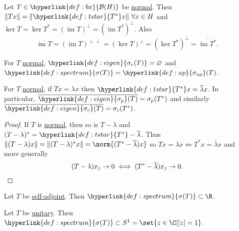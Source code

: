 \documentclass{article}
\renewcommand{\emptyset}{\varnothing}
\DeclareMathOperator{\im}{im}
\begin{document}

\begin{ex}
    Let $T \in \hyperlink{def:bx}{\mathcal{B}(H)}$ be \hyperlink{def:normalMap}{normal}.
    Then $\|Tx\| = \|\hyperlink{def:tstar}{T^*} x\| \ \forall x \in H$ and $\ker T = \ker T^* = (\im T)^\perp = (\im T^*)^\perp$.
    Also
    \begin{equation*}
        \overline{\im T} = (\im T)^{\perp \perp} = (\ker T)^\perp = (\ker T^*)^\perp = \overline{\im T^*}.
    \end{equation*}
\end{ex}

\begin{cor}
    For $T$ \hyperlink{def:normalMap}{normal}, $\hyperlink{def:eigen}{\sigma_r(T)} = \emptyset$ and $\hyperlink{def:spectrum}{\sigma(T)} = \hyperlink{def:ap}{\sigma_{ap}}(T)$.
\end{cor}

\begin{cor}
    For $T$ \hyperlink{def:normalMap}{normal}, if $Tx = \lambda x$ then $\hyperlink{def:tstar}{T^*} x = \overline{\lambda} x$.
    In particular, $\overline{\hyperlink{def:eigen}{\sigma_p}(T)} = \sigma_p(T^*)$ and similarly $\overline{\hyperlink{def:eigen}{\sigma_c}(T)} = \sigma_c(T^*)$.
\end{cor}

\begin{proof}
    If $T$ is \hyperlink{def:normalMap}{normal}, then so is $T - \lambda$ and $(T-\lambda)^* = \hyperlink{def:tstar}{T^*} - \overline{\lambda}$.
    Thus $\|(T-\lambda)x\| = \|(T-\lambda)^* x\| = \norm{(T^* - \overline{\lambda}) x}$ so $Tx = \lambda x \iff T^* x = \overline{\lambda} x$ and more generally
    \begin{equation*}
        (T - \lambda) x_j \to 0 \iff (T^* - \overline{\lambda}) x_j \to 0. \qedhere
    \end{equation*}
\end{proof}

\begin{cor}
    Let $T$ be \hyperlink{def:normalMap}{self-adjoint}. Then $\hyperlink{def:spectrum}{\sigma(T)} \subset \R$.
\end{cor}

\begin{ex}
    Let $T$ be \hyperlink{def:normalMap}{unitary}.
    Then $\hyperlink{def:spectrum}{\sigma(T)} \subset S^1 = \set{z \in \C | |z| = 1}$.
\end{ex}
\end{document}
